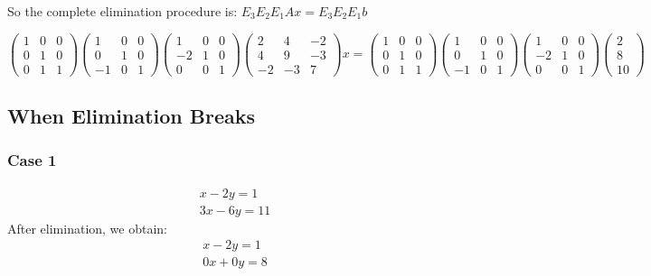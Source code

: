\documentclass[12pt]{article}
\begin{document}
So the complete elimination procedure is:
$E_3 E_2 E_1 Ax = E_3 E_2 E_1 b$

\begin{equation*}
\begin{pmatrix}
1&0&0\\
0&1&0\\
0&1&1
\end{pmatrix}
\begin{pmatrix}
1&0&0\\
0&1&0\\
-1&0&1 
\end{pmatrix}
\begin{pmatrix}
1&0&0\\
-2&1&0\\
0&0&1 
\end{pmatrix}
\begin{pmatrix}
2&4&-2\\
4&9&-3\\
-2&-3&7 
\end{pmatrix}
 x =
\begin{pmatrix}
1&0&0\\
0&1&0\\
0&1&1 
\end{pmatrix}
\begin{pmatrix}
1&0&0\\
0&1&0\\
-1&0&1 
\end{pmatrix}
\begin{pmatrix}
1&0&0\\
-2&1&0\\
0&0&1 
\end{pmatrix}
\begin{pmatrix}
2\\
8\\
10 
\end{pmatrix}
\end{equation*}

\subsection{When Elimination Breaks}
\subsubsection{Case 1}
\begin{align*}
x - 2y = 1\\
3x - 6y = 11
\end{align*}
After elimination, we obtain:
\begin{align*}
x - 2y = 1\\
0x + 0y = 8
\end{align*}
\end{document}
